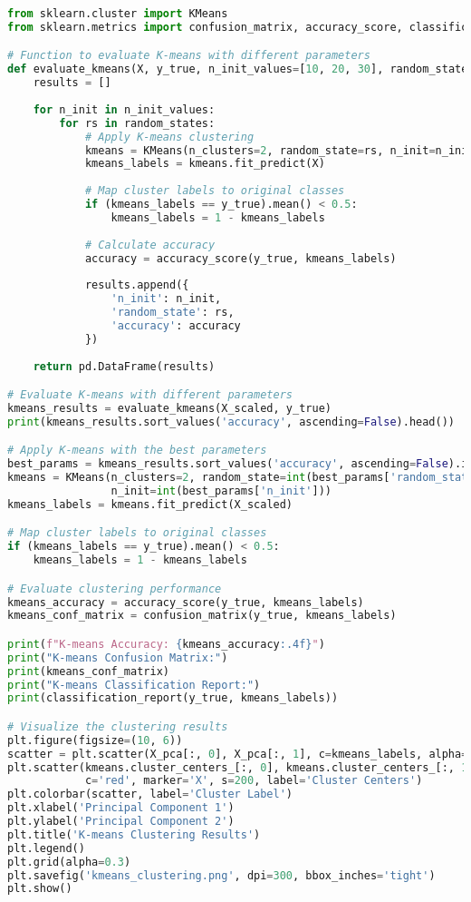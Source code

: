 \begin{lstlisting}[language=Python, caption=K-means Implementation and Parameter Tuning]
from sklearn.cluster import KMeans
from sklearn.metrics import confusion_matrix, accuracy_score, classification_report

# Function to evaluate K-means with different parameters
def evaluate_kmeans(X, y_true, n_init_values=[10, 20, 30], random_states=[42, 100, 200]):
    results = []
    
    for n_init in n_init_values:
        for rs in random_states:
            # Apply K-means clustering
            kmeans = KMeans(n_clusters=2, random_state=rs, n_init=n_init)
            kmeans_labels = kmeans.fit_predict(X)
            
            # Map cluster labels to original classes
            if (kmeans_labels == y_true).mean() < 0.5:
                kmeans_labels = 1 - kmeans_labels
                
            # Calculate accuracy
            accuracy = accuracy_score(y_true, kmeans_labels)
            
            results.append({
                'n_init': n_init,
                'random_state': rs,
                'accuracy': accuracy
            })
    
    return pd.DataFrame(results)

# Evaluate K-means with different parameters
kmeans_results = evaluate_kmeans(X_scaled, y_true)
print(kmeans_results.sort_values('accuracy', ascending=False).head())

# Apply K-means with the best parameters
best_params = kmeans_results.sort_values('accuracy', ascending=False).iloc[0]
kmeans = KMeans(n_clusters=2, random_state=int(best_params['random_state']), 
                n_init=int(best_params['n_init']))
kmeans_labels = kmeans.fit_predict(X_scaled)

# Map cluster labels to original classes
if (kmeans_labels == y_true).mean() < 0.5:
    kmeans_labels = 1 - kmeans_labels

# Evaluate clustering performance
kmeans_accuracy = accuracy_score(y_true, kmeans_labels)
kmeans_conf_matrix = confusion_matrix(y_true, kmeans_labels)

print(f"K-means Accuracy: {kmeans_accuracy:.4f}")
print("K-means Confusion Matrix:")
print(kmeans_conf_matrix)
print("K-means Classification Report:")
print(classification_report(y_true, kmeans_labels))

# Visualize the clustering results
plt.figure(figsize=(10, 6))
scatter = plt.scatter(X_pca[:, 0], X_pca[:, 1], c=kmeans_labels, alpha=0.6, cmap='viridis')
plt.scatter(kmeans.cluster_centers_[:, 0], kmeans.cluster_centers_[:, 1], 
            c='red', marker='X', s=200, label='Cluster Centers')
plt.colorbar(scatter, label='Cluster Label')
plt.xlabel('Principal Component 1')
plt.ylabel('Principal Component 2')
plt.title('K-means Clustering Results')
plt.legend()
plt.grid(alpha=0.3)
plt.savefig('kmeans_clustering.png', dpi=300, bbox_inches='tight')
plt.show()
\end{lstlisting}

